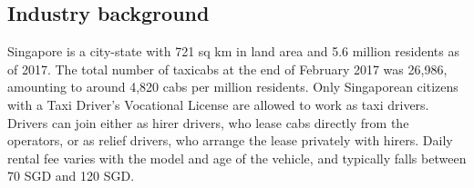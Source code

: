 \documentclass[reviewmode,AEJ]{AEA}
\begin{document}
\subsection{Industry background}
Singapore is a city-state with 721 sq km in land area and 5.6 million residents as of 2017. 
The total number of taxicabs at the end of February 2017 was 26,986, amounting to around 4,820 cabs
per million residents. 
Only Singaporean citizens
with a Taxi Driver's Vocational License are allowed to work as taxi drivers. Drivers can join either 
as hirer drivers, who lease cabs directly from the operators, or as relief drivers, who arrange the 
lease privately with hirers. Daily rental fee varies with the model and age of the vehicle, 
and typically falls between 70 SGD and 120 SGD.
\end{document}
